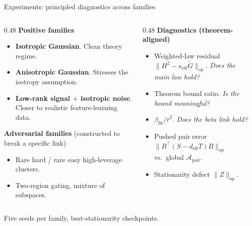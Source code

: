 \documentclass[10pt,aspectratio=169]{beamer}
\newcommand{\T}{^{\!\top}}
\newcommand{\Gw}{\widetilde{G}}
\newcommand{\op}{\mathrm{op}}
\begin{document}
\begin{frame}{Experiments: principled diagnostics across families}
  \footnotesize
  \begin{columns}[T,onlytextwidth]
    \begin{column}{0.48\textwidth}
      \textbf{Positive families}
      \begin{itemize}\setlength\itemsep{2pt}
        \item \textbf{Isotropic Gaussian}. Clean theory regime.
        \item \textbf{Anisotropic Gaussian}. Stresses the isotropy assumption.
        \item \textbf{Low-rank signal $+$ isotropic noise}. Closer to realistic feature-learning data.
      \end{itemize}
      \vspace{4pt}
      \textbf{Adversarial families} (constructed to break a specific link)
      \begin{itemize}\setlength\itemsep{2pt}
        \item Rare hard / rare easy high-leverage clusters.
        \item Two-region gating, mixture of subspaces.
      \end{itemize}
      \vfill\null
    \end{column}
    \begin{column}{0.48\textwidth}
      \textbf{Diagnostics (theorem-aligned)}
      \begin{itemize}\setlength\itemsep{2pt}
        \item Weighted-law residual $\|H^2 - \kappa_{\mathrm{eff}}\Gw\|_\op$. \emph{Does the main law hold?}
        \item Theorem bound ratio. \emph{Is the bound meaningful?}
        \item $\beta_{\mathrm{fit}} / \bar r^2$. \emph{Does the beta link hold?}
        \item Pushed pair error $\|B\T(S - d_{\mathrm{eff}} T) B\|_\op$ vs.\ global $\mathcal{A}_{\mathrm{pair}}$.
        \item Stationarity defect $\|Z\|_\op$.
      \end{itemize}
      \vfill\null
    \end{column}
  \end{columns}
  \vspace{6pt}
  {\color{nicegray}\scriptsize Five seeds per family, best-stationarity checkpoints.}
\end{frame}
\end{document}
